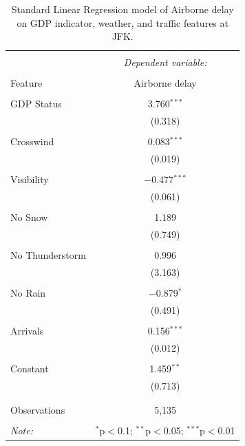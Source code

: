 \documentclass[11pt]{scrartcl}
\begin{document}
\begin{table}[htbp!] \centering 
  \label{} 
\begin{tabular}{@{\extracolsep{5pt}}lc} 
\\[-1.8ex]\hline 
\hline \\[-1.8ex] 
 & \multicolumn{1}{c}{\textit{Dependent variable:}} \\ 
\cline{2-2} 
\\[-1.8ex] Feature & Airborne delay \\ 
\hline \\[-1.8ex] 
 GDP Status & 3.760$^{***}$ \\ 
  & (0.318) \\ 
  & \\ 
 Crosswind & 0.083$^{***}$ \\ 
  & (0.019) \\ 
  & \\ 
 Visibility & $-$0.477$^{***}$ \\ 
  & (0.061) \\ 
  & \\ 
 No Snow & 1.189 \\ 
  & (0.749) \\ 
  & \\ 
 No Thunderstorm & 0.996 \\ 
  & (3.163) \\ 
  & \\ 
 No Rain & $-$0.879$^{*}$ \\ 
  & (0.491) \\ 
  & \\ 
 Arrivals & 0.156$^{***}$ \\ 
  & (0.012) \\ 
  & \\ 
 Constant & 1.459$^{**}$ \\ 
  & (0.713) \\ 
  & \\ 
\hline \\[-1.8ex] 
Observations & 5,135 \\ 
\hline 
\hline \\[-1.8ex] 
\textit{Note:}  & \multicolumn{1}{r}{$^{*}$p$<$0.1; $^{**}$p$<$0.05; $^{***}$p$<$0.01} \\ 
\end{tabular} 
  \caption{Standard Linear Regression model of Airborne delay on GDP indicator, weather, and traffic features at JFK.} 
\end{table} 
\end{document}
